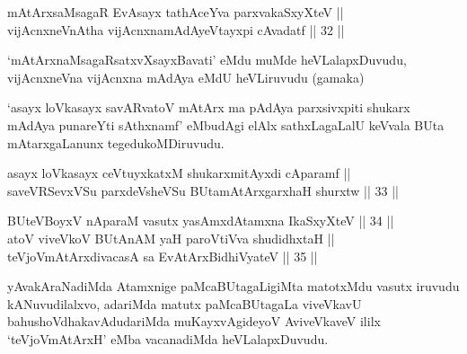 \begin{shl}
\footnotemark[1]mAtArxsaMsagaR EvAsayx tathAceYva parxvakaSxyXteV || \\
vijAcnxneVnAtha vijAcnxnamAdAyeVtayxpi cAvadatf \hfill || 32 || 
\end{shl}

\begin{artha}
`mAtArx\s naMsagaRsatxvXsayxBavati' eMdu muMde
heVLalapxDuvudu, vijAcnxneVna vijAcnxna mAdAya eMdU heVLiruvudu
(gamaka)
\end{artha}

\begin{artha}
`asayx loVkasayx savARvatoV mAtArx ma pAdAya parxsivxpiti shukarx mAdAya punareYti sAthxnamf' eMbudAgi elAlx sathxLagaLalU keVvala BUta mAtarxgaLanunx
tegedukoMDiruvudu.
\end{artha}

\begin{shl}
asayx loVkasayx ceVtuyxkatxM shukarxmitAyxdi cAparamf || \\
saveVRSevxVSu parxdeVsheVSu BUtamAtArxgarxhaH shurxtw \hfill || 33 ||  
\end{shl}

\begin{shl}
\footnotemark[2]BUteVBoyxV nAparaM vasutx yasAmxdAtamxna IkaSxyXteV \hfill || 34 || \\
atoV viveVkoV BUtAnAM yaH paroV\s tiVva shudidhxtaH || \\
teVjoVmAtArxdivacasA sa EvAtArxBidhiVyateV \hfill || 35 ||  
\end{shl}

\begin{artha}
yAvakAraNadiMda Atamxnige paMcaBUtagaLigiMta matotxMdu vasutx iruvudu
kANuvudilalxvo, adariMda matutx paMcaBUtagaLa viveVkavU
bahushoVdhakavAdudariMda muKayxvAgideyoV AviveVkaveV ililx
`teVjoVmAtArxH' eMba vacanadiMda heVLalapxDuvudu.
\end{artha}

